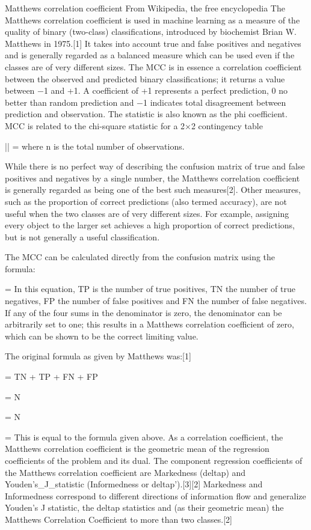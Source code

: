 Matthews correlation coefficient
From Wikipedia, the free encyclopedia
The Matthews correlation coefficient is used in machine learning as a measure of the quality of binary (two-class) classifications, introduced by biochemist Brian W. Matthews in 1975.[1] It takes into account true and false positives and negatives and is generally regarded as a balanced measure which can be used even if the classes are of very different sizes. The MCC is in essence a correlation coefficient between the observed and predicted binary classifications; it returns a value between −1 and +1. A coefficient of +1 represents a perfect prediction, 0 no better than random prediction and −1 indicates total disagreement between prediction and observation. The statistic is also known as the phi coefficient. MCC is related to the chi-square statistic for a 2×2 contingency table

|| = 
where n is the total number of observations.

While there is no perfect way of describing the confusion matrix of true and false positives and negatives by a single number, the Matthews correlation coefficient is generally regarded as being one of the best such measures[2]. Other measures, such as the proportion of correct predictions (also termed accuracy), are not useful when the two classes are of very different sizes. For example, assigning every object to the larger set achieves a high proportion of correct predictions, but is not generally a useful classification.

The MCC can be calculated directly from the confusion matrix using the formula:


 =  { }
In this equation, TP is the number of true positives, TN the number of true negatives, FP the number of false positives and FN the number of false negatives. If any of the four sums in the denominator is zero, the denominator can be arbitrarily set to one; this results in a Matthews correlation coefficient of zero, which can be shown to be the correct limiting value.

The original formula as given by Matthews was:[1]


 = TN + TP + FN + FP

 =  { N }

 =  { N }

 =  { }
This is equal to the formula given above. As a correlation coefficient, the Matthews correlation coefficient is the geometric mean of the regression coefficients of the problem and its dual. The component regression coefficients of the Matthews correlation coefficient are Markedness (deltap) and Youden's_J_statistic (Informedness or deltap').[3][2] Markedness and Informedness correspond to different directions of information flow and generalize Youden's J statistic, the deltap statistics and (as their geometric mean) the Matthews Correlation Coefficient to more than two classes.[2]
